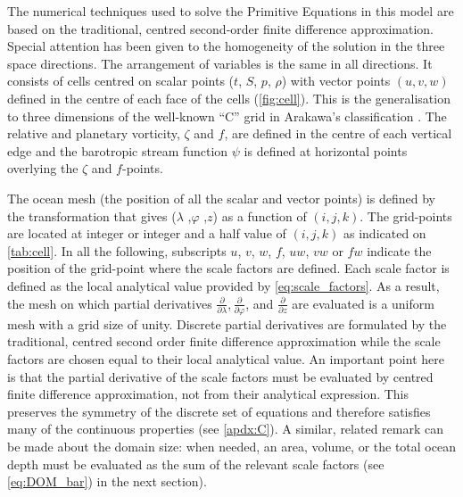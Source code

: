 \documentclass[../main/NEMO_manual]{subfiles}
\begin{document}
The numerical techniques used to solve the Primitive Equations in this model are based on the traditional,
centred second-order finite difference approximation.
Special attention has been given to the homogeneity of the solution in the three space directions.
The arrangement of variables is the same in all directions.
It consists of cells centred on scalar points ($t$, $S$, $p$, $\rho$) with vector points $(u, v, w)$ defined in
the centre of each face of the cells (\autoref{fig:cell}).
This is the generalisation to three dimensions of the well-known ``C'' grid in Arakawa's classification
\citep{Mesinger_Arakawa_Bk76}.
The relative and planetary vorticity, $\zeta$ and $f$, are defined in the centre of each vertical edge and
the barotropic stream function $\psi$ is defined at horizontal points overlying the $\zeta$ and $f$-points.

The ocean mesh (\ie the position of all the scalar and vector points) is defined by
the transformation that gives ($\lambda$ ,$\varphi$ ,$z$) as a function of $(i,j,k)$.
The grid-points are located at integer or integer and a half value of $(i,j,k)$ as indicated on \autoref{tab:cell}.
In all the following, subscripts $u$, $v$, $w$, $f$, $uw$, $vw$ or $fw$ indicate the position of
the grid-point where the scale factors are defined.
Each scale factor is defined as the local analytical value provided by \autoref{eq:scale_factors}.
As a result,
the mesh on which partial derivatives $\frac{\partial}{\partial \lambda}, \frac{\partial}{\partial \varphi}$,
and $\frac{\partial}{\partial z} $ are evaluated is a uniform mesh with a grid size of unity.
Discrete partial derivatives are formulated by the traditional,
centred second order finite difference approximation while
the scale factors are chosen equal to their local analytical value.
An important point here is that the partial derivative of the scale factors must be evaluated by
centred finite difference approximation, not from their analytical expression.
This preserves the symmetry of the discrete set of equations and
therefore satisfies many of the continuous properties (see \autoref{apdx:C}).
A similar, related remark can be made about the domain size:
when needed, an area, volume, or the total ocean depth must be evaluated as the sum of the relevant scale factors
(see \autoref{eq:DOM_bar}) in the next section).
\end{document}
